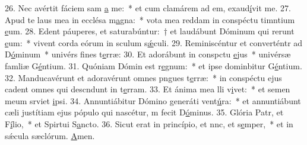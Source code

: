 26. Nec avértit fáciem sam \uline{a} me:~* et cum clamárem ad em, exaud\uline{í}vit me.
27. Apud te laus mea in ecclésa m\uline{a}gna:~* vota mea reddam in conspéctu timntium \uline{e}um.
28. Edent páuperes, et saturabúntur:~† et laudábunt Dóminum qui rerunt \uline{e}um:~* vivent corda eórum in sculum s\uline{ǽ}culi.
29. Reminiscéntur et converténtr ad D\uline{ó}minum~* univérs fines t\uline{e}rræ:
30. Et adorábunt in conspctu \uline{e}jus~* univérsæ famliæ G\uline{é}ntium.
31. Quóniam Dómin est r\uline{e}gnum:~* et ipse dominbitur G\uline{é}ntium.
32. Manducavérunt et adoravérunt omnes pngues t\uline{e}rræ:~* in conspéctu ejus cadent omnes qui descndunt in t\uline{e}rram.
33. Et ánima mea lli v\uline{i}vet:~* et semen meum srviet \uline{i}psi.
34. Annuntiábitur Dómino generáti vent\uline{ú}ra:~* et annuntiábunt cæli justítiam ejus pópulo qui nascétur, m fecit D\uline{ó}minus.
35. Glória Patr, et F\uline{í}lio,~* et Spirtui S\uline{a}ncto.
36. Sicut erat in princípio, et nnc, et s\uline{e}mper,~* et in sǽcula sæclórum. \uline{A}men.
